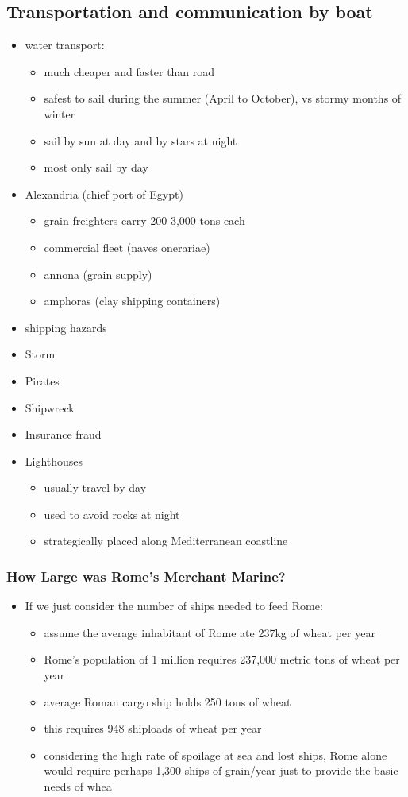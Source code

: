 \documentclass[12pt, twoside]{article}
\begin{document}
\subsection{Transportation and communication by boat}
\begin{itemize}
\item water transport:
	\begin{itemize}
	\item much cheaper and faster than road
	\item safest to sail during the summer (April to October), vs stormy months of winter
	\item sail by sun at day and by stars at night
	\item most only sail by day
	\end{itemize}
\item Alexandria (chief port of Egypt)
	\begin{itemize}
	\item grain freighters carry 200-3,000 tons each
	\item commercial fleet (naves onerariae)
	\item annona (grain supply)
	\item amphoras (clay shipping containers)
	\end{itemize}
\item shipping hazards
\item Storm
\item Pirates
\item Shipwreck
\item Insurance fraud
\item Lighthouses
	\begin{itemize}
	\item  usually travel by day
	\item used to avoid rocks at night
	\item strategically placed along Mediterranean coastline
	\end{itemize}
\end{itemize}

\subsubsection{How Large was Rome’s Merchant Marine?}
\begin{itemize}
\item If we just consider the number of ships needed to feed Rome:
	\begin{itemize}
	\item assume the average inhabitant of Rome ate 237kg of wheat per year
	\item Rome’s population of 1 million requires 237,000 metric tons of wheat per year
	\item average Roman cargo ship holds 250 tons of wheat
	\item this requires 948 shiploads of wheat per year
	\item considering the high rate of spoilage at sea and lost ships, Rome alone would require perhaps 1,300 ships of grain/year just to provide the basic needs of whea
	\end{itemize}
\end{itemize}
\end{document}
